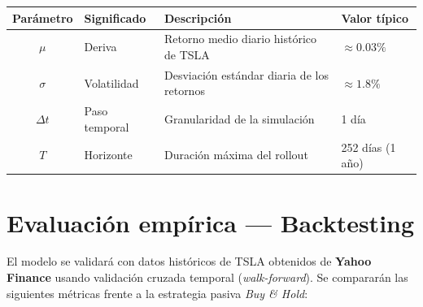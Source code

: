 \documentclass[11pt, a4paper]{article}
\newcommand{\highlight}[2][acc1]{\textcolor{#1}{\textbf{#2}}}
\begin{document}
\begin{tcolorbox}[darkcard=acc3, title={Parámetros del modelo}]
\renewcommand{\arraystretch}{1.35}
\begin{tabularx}{\linewidth}{@{} c l X l @{}}
  \toprule
  \color{acc3}\textbf{Parámetro} &
  \color{acc3}\textbf{Significado} &
  \color{acc3}\textbf{Descripción} &
  \color{acc3}\textbf{Valor típico} \\
  \midrule
  $\mu$        & Deriva        & Retorno medio diario histórico de TSLA
                               & $\approx 0.03\%$ \\
  $\sigma$     & Volatilidad   & Desviación estándar diaria de los retornos
                               & $\approx 1.8\%$ \\
  $\Delta t$   & Paso temporal & Granularidad de la simulación
                               & 1 día \\
  $T$          & Horizonte     & Duración máxima del rollout
                               & 252 días (1 año) \\
  \bottomrule
\end{tabularx}
\end{tcolorbox}

\section{Evaluación empírica — Backtesting}

El modelo se validará con datos históricos de TSLA obtenidos de
\highlight{Yahoo Finance} usando validación cruzada temporal
(\emph{walk-forward}). Se compararán las siguientes métricas frente
a la estrategia pasiva \emph{Buy \& Hold}:

\begin{center}
\end{center}
\end{document}
